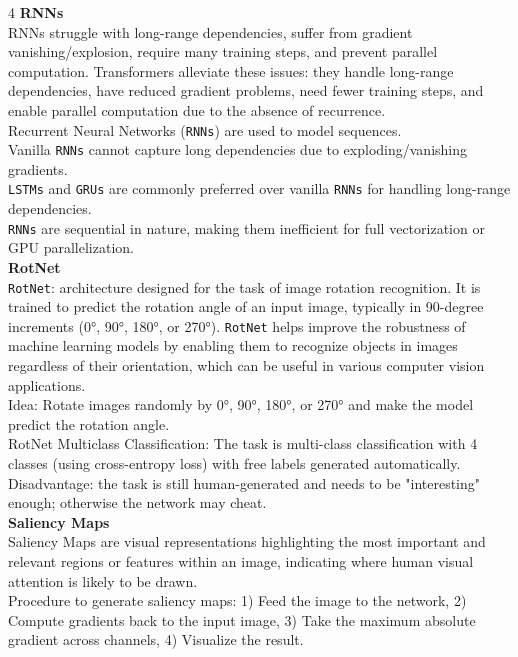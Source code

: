 \documentclass[8pt]{extarticle}
\begin{document}
\begin{multicols}{4}
\vspace{2pt}\textbf{RNNs}\\
RNNs struggle with long-range dependencies, suffer from gradient vanishing/explosion, require many training steps, and prevent parallel computation. Transformers alleviate these issues: they handle long-range dependencies, have reduced gradient problems, need fewer training steps, and enable parallel computation due to the absence of recurrence.\\
Recurrent Neural Networks (\texttt{RNNs}) are used to model sequences.\\
Vanilla \texttt{RNNs} cannot capture long dependencies due to exploding/vanishing gradients.\\
\texttt{LSTMs} and \texttt{GRUs} are commonly preferred over vanilla \texttt{RNNs} for handling long-range dependencies.\\
\texttt{RNNs} are sequential in nature, making them inefficient for full vectorization or GPU parallelization.\\
\vspace{2pt}\textbf{RotNet}\\
\texttt{RotNet}: architecture designed for the task of image rotation recognition. It is trained to predict the rotation angle of an input image, typically in 90-degree increments (0°, 90°, 180°, or 270°). \texttt{RotNet} helps improve the robustness of machine learning models by enabling them to recognize objects in images regardless of their orientation, which can be useful in various computer vision applications.\\
Idea: Rotate images randomly by 0°, 90°, 180°, or 270° and make the model predict the rotation angle.\\
RotNet Multiclass Classification: The task is multi-class classification with 4 classes (using cross-entropy loss) with free labels generated automatically. Disadvantage: the task is still human-generated and needs to be "interesting" enough; otherwise the network may cheat.\\
\vspace{2pt}\textbf{Saliency Maps}\\
Saliency Maps are visual representations highlighting the most important and relevant regions or features within an image, indicating where human visual attention is likely to be drawn.\\
Procedure to generate saliency maps: 1) Feed the image to the network, 2) Compute gradients back to the input image, 3) Take the maximum absolute gradient across channels, 4) Visualize the result.\\

\end{multicols}
\end{document}
